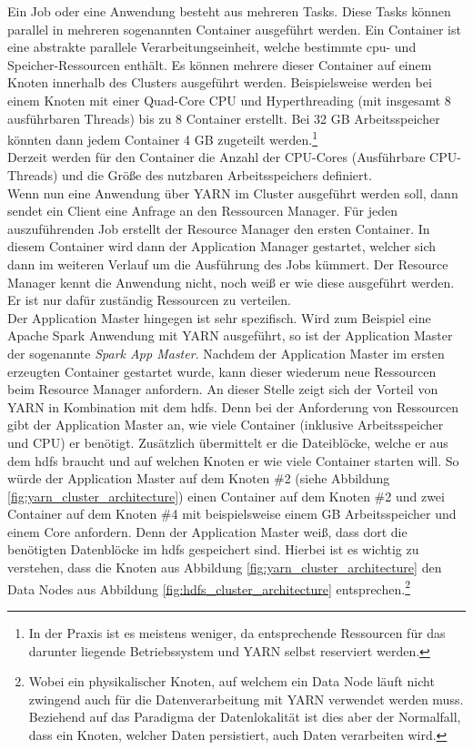 \noindent
Ein Job oder eine Anwendung besteht aus mehreren Tasks. Diese Tasks können parallel in mehreren sogenannten Container ausgeführt werden. Ein Container ist eine abstrakte parallele Verarbeitungseinheit, welche bestimmte \acrshort{cpu}- und Speicher-Ressourcen enthält. Es können mehrere dieser Container auf einem Knoten innerhalb des Clusters ausgeführt werden. Beispielsweise werden bei einem Knoten mit einer Quad-Core CPU und Hyperthreading (mit insgesamt 8 ausführbaren Threads) bis zu 8 Container erstellt. Bei 32 GB Arbeitsspeicher könnten dann jedem Container 4 GB zugeteilt werden.\footnote{In der Praxis ist es meistens weniger, da entsprechende Ressourcen für das darunter liegende Betriebssystem und YARN selbst reserviert werden.}\\
Derzeit werden für den Container die Anzahl der CPU-Cores (Ausführbare CPU-Threads) und die Größe des nutzbaren Arbeitsspeichers definiert.\cite[S. 48 ff.]{expert_hadoop_admin}\\

\noindent
Wenn nun eine Anwendung über YARN im Cluster ausgeführt werden soll, dann sendet ein Client eine Anfrage an den Ressourcen Manager. 
Für jeden auszuführenden Job erstellt der Resource Manager den ersten Container. In diesem Container wird dann der Application Manager gestartet, welcher sich dann im weiteren Verlauf um die Ausführung des Jobs kümmert. Der Resource Manager kennt die Anwendung nicht, noch weiß er wie diese ausgeführt werden. 
Er ist nur dafür zuständig Ressourcen zu verteilen.\\ 
Der Application Master hingegen ist sehr spezifisch. Wird zum Beispiel eine Apache Spark Anwendung mit YARN ausgeführt, so ist der Application Master der sogenannte \textit{Spark App Master}. Nachdem der Application Master im ersten erzeugten Container gestartet wurde, kann dieser wiederum neue Ressourcen beim Resource Manager anfordern. 
An dieser Stelle zeigt sich der Vorteil von YARN in Kombination mit dem \gls{hdfs}. Denn bei der Anforderung von Ressourcen gibt der Application Master an, wie viele Container (inklusive Arbeitsspeicher und CPU) er benötigt. Zusätzlich übermittelt er die Dateiblöcke, welche er aus dem \gls{hdfs} braucht und auf welchen Knoten er wie viele Container starten will. So würde der Application Master auf dem Knoten \#2 (siehe Abbildung \ref{fig:yarn_cluster_architecture}) einen Container auf dem Knoten \#2 und zwei Container auf dem Knoten \#4 mit beispielsweise einem GB Arbeitsspeicher und einem Core anfordern. 
Denn der Application Master weiß, dass dort die benötigten Datenblöcke im \gls{hdfs} gespeichert sind. Hierbei ist es wichtig zu verstehen, dass die Knoten aus Abbildung \ref{fig:yarn_cluster_architecture} den Data Nodes aus Abbildung \ref{fig:hdfs_cluster_architecture} entsprechen.\footnote{Wobei ein physikalischer Knoten, auf welchem ein Data Node läuft nicht zwingend auch für die Datenverarbeitung mit YARN verwendet werden muss. Beziehend auf das Paradigma der Datenlokalität ist dies aber der Normalfall, dass ein Knoten, welcher Daten persistiert, auch Daten verarbeiten wird.}\\

